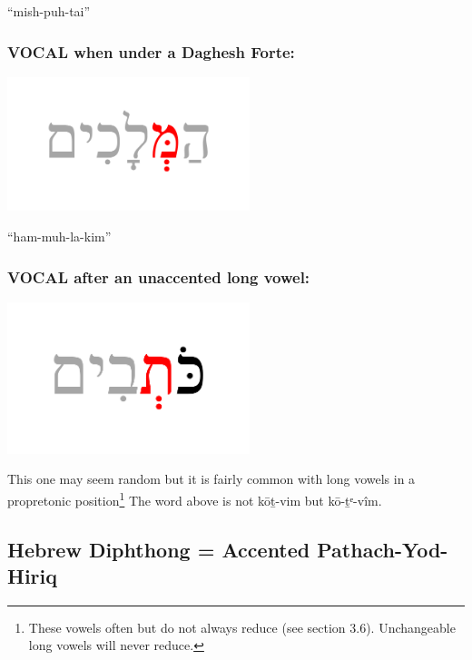 \documentclass[
]{turabian-researchpaper}
\begin{document}
``mish-puh-tai''

\hypertarget{vocal-when-under-a-daghesh-forte}{%
\subsubsection*{VOCAL when under a Daghesh Forte:}\label{vocal-when-under-a-daghesh-forte}}

\begin{center}\includegraphics[width=200pt]{images/03.sheva-fortevocal} \end{center}

``ham-muh-la-kim''

\hypertarget{vocal-after-an-unaccented-long-vowel}{%
\subsubsection*{VOCAL after an unaccented long vowel:}\label{vocal-after-an-unaccented-long-vowel}}

\begin{center}\includegraphics[width=200pt]{images/03.sheva-unaccentedlongvocal} \end{center}

This one may seem random but it is fairly common with long vowels in a propretonic position\footnote{These vowels often but do not always reduce (see section 3.6). Unchangeable long vowels will never reduce.} The word above is not kōṯ-vim but kō-ṯᵉ-vîm.

\hypertarget{three_5}{%
\subsection{Hebrew Diphthong = Accented Pathach-Yod-Hiriq}\label{three_5}}
\end{document}

